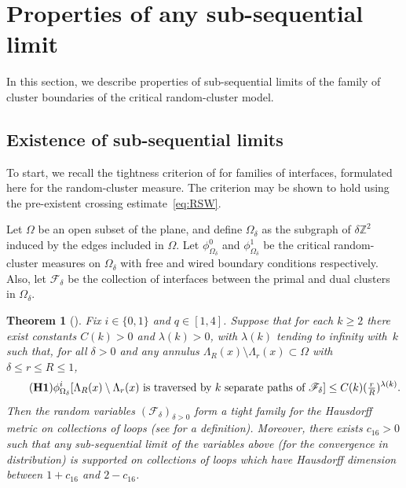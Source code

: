 \documentclass[a4paper,oneside,11pt]{article}
\newtheorem{theorem}{Theorem}[section]
\numberwithin{equation}{section}
\numberwithin{equation}{section}
\numberwithin{equation}{section}
\newcommand{\bbZ}{\mathbb{Z}}
\newcommand{\la}{\lambda}
\begin{document}
\section{Properties of any sub-sequential limit}\label{sec:6}

In this section, we describe properties of sub-sequential limits of the family of cluster boundaries of the critical random-cluster model.

\subsection{Existence of sub-sequential limits}

To start, we recall the tightness criterion of \cite{AizBur99} for families of interfaces, formulated here for the random-cluster measure. 
The criterion may be shown to hold using the pre-existent crossing estimate~\eqref{eq:RSW}.

Let $\Omega$ be an open subset of the plane, and define $\Omega_\delta$ as the subgraph of $\delta\bbZ^2$ induced by the edges included in $\Omega$. 
Let $\phi_{\Omega_\delta}^0$ and $\phi_{\Omega_\delta}^1$ be the critical random-cluster measures on $\Omega_\delta$ with free and wired boundary conditions respectively. Also, let $\mathcal F_\delta$ be the collection of interfaces between the primal and dual clusters in $\Omega_\delta$. 

\begin{theorem}[\cite{AizBur99}]\label{thm:tightness}
	Fix $i \in \{0,1\}$ and $q \in [1,4]$. 
	Suppose that for each $k\geq 2$ there exist constants $C(k)>0$ and $\lambda(k)>0$, with $\la(k)$ tending to infinity with~$k$ such that, 
	for all $\delta > 0$ and any annulus $\Lambda_R(x)\setminus\Lambda_r(x) \subset \Omega$ with $\delta\le r\le R\le 1$,
	\begin{equation}\tag{{\bf H1}}\label{eq:H1}
		\phi_{\Omega_\delta}^i[\Lambda_R(x)\setminus\Lambda_r(x)\text{ is traversed by $k$ separate paths of }\mathcal F_\delta]\le C(k)(\tfrac rR)^{\lambda(k)}.
	\end{equation}
	Then the random variables $(\mathcal F_\delta)_{\delta > 0}$ form a tight family for the Hausdorff metric on collections of loops (see \cite{AizBur99} for a definition).
	Moreover, there exists $c_{16}>0$ such that any sub-sequential limit of the variables above (for the convergence in distribution) 
    is supported on collections of loops which have Hausdorff dimension between $1+c_{16}$ and $2-c_{16}$.
\end{theorem}
\end{document}
